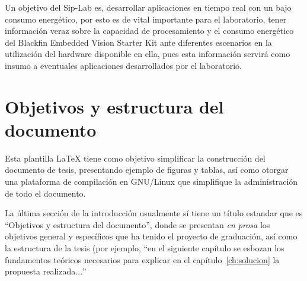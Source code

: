 Un objetivo del Sip-Lab es, desarrollar aplicaciones en tiempo real con un bajo consumo energético, por esto es de vital importante para el laboratorio, tener información veraz sobre la capacidad de procesamiento y el consumo energético del Blackfin Embedded Vision Starter Kit ante diferentes escenarios en la utilización del hardware disponible en ella, pues esta información servirá como insumo a eventuales aplicaciones desarrollados por el laboratorio.

  






\section{Objetivos y estructura del documento}

Esta plantilla LaTeX tiene como objetivo simplificar la construcción del
documento de tesis, presentando ejemplo de figuras y tablas, así como otorgar
una plataforma de compilación en GNU/Linux que simplifique la administración de
todo el documento.

La última sección de la introducción usualmente sí tiene un título estandar que
es ``Objetivos y estructura del documento'', donde se presentan \emph{en prosa}
los objetivos general y específicos que ha tenido el proyecto de graduación,
así como la estructura de la tesis (por ejemplo, ``en el siguiente capítulo se
esbozan los fundamentos teóricos necesarios para explicar en el
capítulo~\ref{ch:solucion} la propuesta realizada$\ldots$''

